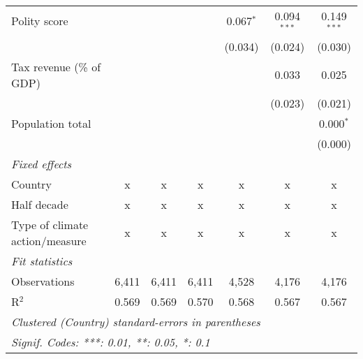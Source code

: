 \begin{tabular}{lcccccc}
   Polity score                                                    &             &                &                & 0.067$^{*}$    & 0.094$^{***}$  & 0.149$^{***}$\\   
                                                                   &             &                &                & (0.034)        & (0.024)        & (0.030)\\   
   Tax revenue (\% of GDP)                                         &             &                &                &                & 0.033          & 0.025\\   
                                                                   &             &                &                &                & (0.023)        & (0.021)\\   
   Population total                                                &             &                &                &                &                & 0.000$^{*}$\\   
                                                                   &             &                &                &                &                & (0.000)\\   
   \emph{Fixed effects}\\
   Country                                                         & x           & x              & x              & x              & x              & x\\  
   Half decade                                                     & x           & x              & x              & x              & x              & x\\  
   Type of climate action/measure                                  & x           & x              & x              & x              & x              & x\\  
   \midrule \emph{Fit statistics}\\
   Observations                                                    & 6,411       & 6,411          & 6,411          & 4,528          & 4,176          & 4,176\\  
   R$^2$                                                           & 0.569       & 0.569          & 0.570          & 0.568          & 0.567          & 0.567\\  
   \midrule
   \multicolumn{7}{l}{\emph{Clustered (Country) standard-errors in parentheses}}\\
   \multicolumn{7}{l}{\emph{Signif. Codes: ***: 0.01, **: 0.05, *: 0.1}}\\
\end{tabular}
\par\endgroup


